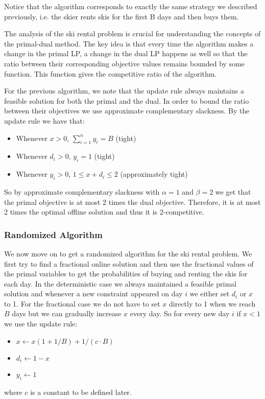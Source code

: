 Notice that the algorithm corresponds to exactly the same strategy we described previously, i.e. the skier rents skis for the first B days and then buys them.


The analysis of the ski rental problem is crucial for understanding the concepts of the primal-dual method. 
The key idea is that every time the algorithm makes a change in the primal LP, a change in the dual LP happens as well so that the ratio between their corresponding objective values remains bounded by some function. 
This function gives the competitive ratio of the algorithm.

For the previous algorithm, we note that the update rule always maintains a feasible solution for both the primal and the dual. 
In order to bound the ratio between their objectives we use approximate complementary slackness. 
By the update rule we have that:
\begin{itemize}
\item Whenever $x > 0$, $\sum^n_{i=1} y_i = B$ (tight)
\item Whenever $d_i > 0$, $y_i = 1$ (tight)
\item Whenever $y_i > 0$, $1 \le x+d_i \le 2$ (approximately tight)
\end{itemize}

So by approximate complementary slackness with $\alpha = 1$ and $\beta = 2$ we get that the primal objective is at most 2 times the dual objective. Therefore, it is at most 2 times the optimal offline solution and thus it is 2-competitive.

\subsubsection{Randomized Algorithm}
We now move on to get a randomized algorithm for the ski rental problem. 
We first try to find a fractional online solution and then use the fractional values of the primal variables to get the probabilities of buying and renting the skis for each day.
In the deterministic case we always maintained a feasible primal solution and whenever a new constraint appeared on day $i$ we either set $d_i$ or $x$ to 1. For the fractional case we do not have to set $x$ directly to 1 when we reach $B$ days but we can gradually increase $x$ every day. So for every new day $i$ if $x<1$ we use the update rule:
\begin{itemize}
\item $x \leftarrow x(1+1/B) + 1/(c\cdot B)$
\item $d_i \leftarrow 1 - x$
\item $y_i \leftarrow 1$
\end{itemize}
where $c$ is a constant to be defined later.

